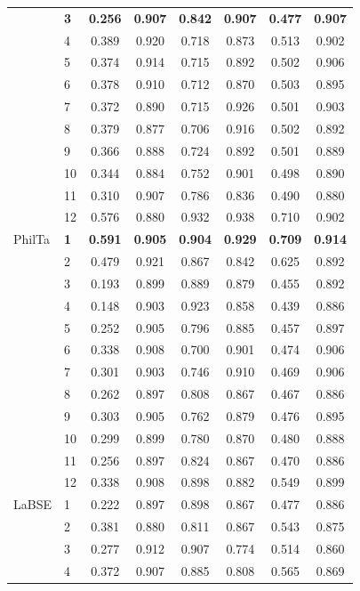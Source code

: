 \begin{longtable}{llcccccc}
 & \textbf{3} & \textbf{0.256} & \textbf{0.907} & \textbf{0.842} & \textbf{0.907} & \textbf{0.477} & \textbf{0.907} \\
 & 4 & 0.389 & 0.920 & 0.718 & 0.873 & 0.513 & 0.902 \\
 & 5 & 0.374 & 0.914 & 0.715 & 0.892 & 0.502 & 0.906 \\
 & 6 & 0.378 & 0.910 & 0.712 & 0.870 & 0.503 & 0.895 \\
 & 7 & 0.372 & 0.890 & 0.715 & 0.926 & 0.501 & 0.903 \\
 & 8 & 0.379 & 0.877 & 0.706 & 0.916 & 0.502 & 0.892 \\
 & 9 & 0.366 & 0.888 & 0.724 & 0.892 & 0.501 & 0.889 \\
 & 10 & 0.344 & 0.884 & 0.752 & 0.901 & 0.498 & 0.890 \\
 & 11 & 0.310 & 0.907 & 0.786 & 0.836 & 0.490 & 0.880 \\
 & 12 & 0.576 & 0.880 & 0.932 & 0.938 & 0.710 & 0.902 \\
\midrule
PhilTa & \textbf{1} & \textbf{0.591} & \textbf{0.905} & \textbf{0.904} & \textbf{0.929} & \textbf{0.709} & \textbf{0.914} \\
 & 2 & 0.479 & 0.921 & 0.867 & 0.842 & 0.625 & 0.892 \\
 & 3 & 0.193 & 0.899 & 0.889 & 0.879 & 0.455 & 0.892 \\
 & 4 & 0.148 & 0.903 & 0.923 & 0.858 & 0.439 & 0.886 \\
 & 5 & 0.252 & 0.905 & 0.796 & 0.885 & 0.457 & 0.897 \\
 & 6 & 0.338 & 0.908 & 0.700 & 0.901 & 0.474 & 0.906 \\
 & 7 & 0.301 & 0.903 & 0.746 & 0.910 & 0.469 & 0.906 \\
 & 8 & 0.262 & 0.897 & 0.808 & 0.867 & 0.467 & 0.886 \\
 & 9 & 0.303 & 0.905 & 0.762 & 0.879 & 0.476 & 0.895 \\
 & 10 & 0.299 & 0.899 & 0.780 & 0.870 & 0.480 & 0.888 \\
 & 11 & 0.256 & 0.897 & 0.824 & 0.867 & 0.470 & 0.886 \\
 & 12 & 0.338 & 0.908 & 0.898 & 0.882 & 0.549 & 0.899 \\
\midrule
LaBSE & 1 & 0.222 & 0.897 & 0.898 & 0.867 & 0.477 & 0.886 \\
 & 2 & 0.381 & 0.880 & 0.811 & 0.867 & 0.543 & 0.875 \\
 & 3 & 0.277 & 0.912 & 0.907 & 0.774 & 0.514 & 0.860 \\
 & 4 & 0.372 & 0.907 & 0.885 & 0.808 & 0.565 & 0.869 \\

\end{longtable}
